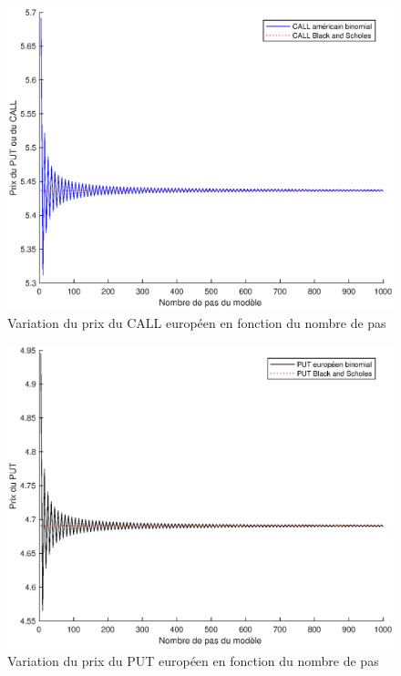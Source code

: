 \begin{figure}[H]
\centering
\includegraphics[scale=0.6]{./img/CALL_AMER-BS.eps}
\caption{Variation du prix du CALL européen en fonction du nombre de pas}
\label{fig:call_amer_mb}
\end{figure}

\begin{figure}[H]
\centering
\includegraphics[scale=0.6]{./img/PUT_EURO-BS.eps}
\caption{Variation du prix du PUT européen en fonction du nombre de pas}
\label{fig:put_euro_mb}
\end{figure}

